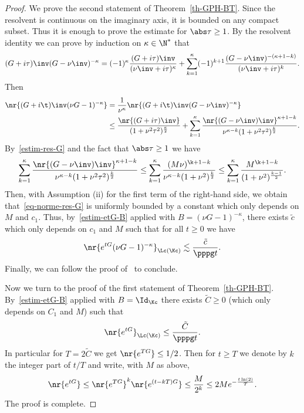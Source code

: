 \begin{proof}
We prove the second statement of Theorem~\ref{th-GPH-BT}. Since the resolvent is continuous on the imaginary axis, it is bounded on any compact subset. Thus it is enough to prove the estimate for $\abs \tau \geq 1$. By the resolvent identity we can prove by induction on $\kappa \in \N^*$ that
\[
(G+i\tau)\inv (G - \nu\inv)^{-\kappa} = (-1)^{\kappa} \frac {(G+i\tau)\inv}{(\nu\inv + i\tau)^\kappa} + \sum_{k=1}^{\kappa} (-1)^{k+1} \frac {(G - \nu\inv)^{-(\kappa+1-k)}}{(\nu\inv + i\tau)^k}.
\]
Then
\begin{equation}\label{eq-norme-res-G}
\begin{aligned}
\nr{(G+i\t)\inv (\nu G - 1)^{-\kappa}} & = \frac 1 {\nu^\kappa} \nr{(G+i\t)\inv (G - \nu\inv)^{-\kappa}}\\
& \leq \frac {\nr{(G+i\tau)\inv}} {(1+\nu^2 \tau^2)^{\frac \kappa 2}} + \sum_{k=1}^\kappa \frac {\nr{(G - \nu\inv)\inv}^{\kappa+1-k}}{\nu^{\kappa-k} (1+\nu^2\tau^2)^{\frac k 2}}.
\end{aligned}
\end{equation}
By~\eqref{estim-res-G} and the fact that $\abs \tau \geq 1$ we have
\[
\sum_{k=1}^\kappa \frac {\nr{(G - \nu\inv)\inv}^{\kappa+1-k}}{\nu^{\kappa-k} (1+\nu^2\tau^2)^{\frac k 2}} \leq \sum_{k=1}^\kappa \frac {(M\nu)^{\k+1-k}}{\nu^{\kappa-k} (1+\nu^2)^{\frac k 2}} \leq \sum_{k=1}^\kappa \frac {M^{\k+1-k}}{(1+\nu^2)^{\frac {k-1} 2}}.
\]
Then, with Assumption (ii) for the first term of the right-hand side, we obtain that~\eqref{eq-norme-res-G} is uniformly bounded by a constant which only depends on $M$ and $c_1$. Thus, by~\eqref{estim-etG-B} applied with $B = (\nu G - 1)^{-\kappa}$, there exists $\tilde c$ which only depends on $c_1$ and $M$ such that for all $t \geq 0$ we have
\[
\nr{e^{tG} (\nu G - 1)^{-\kappa}}_{\Lc(\Kc)} \lesssim \frac {\tilde c} {\pppg t}.
\]
Finally, we can follow the proof of~\cite[Proposition~3.1]{BatkaiEngPruSch06} to conclude.

Now we turn to the proof of the first statement of Theorem~\ref{th-GPH-BT}. By~\eqref{estim-etG-B} applied with $B=\Id_\Kc$ there exists $\tilde C \geq 0$ (which only depends on $C_1$ and $M$) such that
\[
\nr{e^{tG}}_{\Lc(\Kc)} \leq \frac {\tilde C}{\pppg t}.
\]
In particular for $T = 2 \tilde C$ we get $\nr{e^{TG}} \leq 1/2$. Then for $t \geq T$ we denote by $k$ the integer part of $t/T$ and write, with $M$ as above,
\[
\nr{e^{tG}} \leq \nr{e^{TG}}^k \nr{e^{(t-kT)G}} \leq \frac M {2^k} \leq 2 M e^{-\frac {t\ln(2)}T}.
\]
The proof is complete.
\end{proof}

